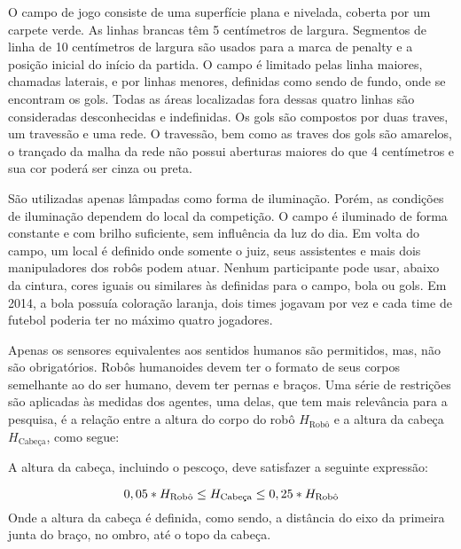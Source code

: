O campo de jogo consiste de uma superfície plana e nivelada, coberta por um carpete verde. As linhas brancas têm 5 centímetros de largura. Segmentos de linha de 10 centímetros de largura são usados para a marca de penalty e a posição inicial do início da partida. O campo é limitado pelas linha maiores, chamadas laterais, e por linhas menores, definidas como sendo de fundo, onde se encontram os gols. Todas as áreas localizadas fora dessas quatro linhas são consideradas desconhecidas e indefinidas. Os gols são compostos por duas traves, um travessão e uma rede. O travessão, bem como as traves dos gols são amarelos, o trançado da malha da rede não possui aberturas maiores do que 4 centímetros e sua cor poderá ser cinza ou preta. 

São utilizadas apenas lâmpadas como forma de iluminação. Porém, as condições de iluminação dependem do local da competição. O campo é iluminado de forma constante e com brilho suficiente, sem influência da luz do dia. Em volta do campo, um local é definido onde somente o juiz, seus assistentes e mais dois manipuladores dos robôs podem atuar. Nenhum participante pode usar, abaixo da cintura, cores iguais ou similares às definidas para o campo, bola ou gols. Em 2014, a bola possuía coloração laranja, dois times jogavam por vez e cada time de futebol poderia ter no máximo quatro jogadores. 

Apenas os sensores equivalentes aos sentidos humanos são permitidos, mas, não são obrigatórios. Robôs humanoides devem ter o formato de seus corpos semelhante ao do ser humano, devem ter pernas e braços. Uma série de restrições são aplicadas às medidas dos agentes, uma delas, que tem mais relevância para a pesquisa, é a relação entre a altura do corpo do robô \(H_{\text{Robô}}\) e a altura da cabeça \(H_{\text{Cabeça}}\), como segue:

A altura da cabeça, incluindo o pescoço, deve satisfazer a seguinte expressão:\hfill 

\begin{equation}
0,05 * H_{\text{Robô}} \leq H_{\text{Cabeça}} \leq 0,25 * H_{\text{Robô}}  \\
\end{equation}
Onde a altura da cabeça é definida, como sendo, a distância do eixo da primeira junta do braço, no ombro, até o topo da cabeça.

